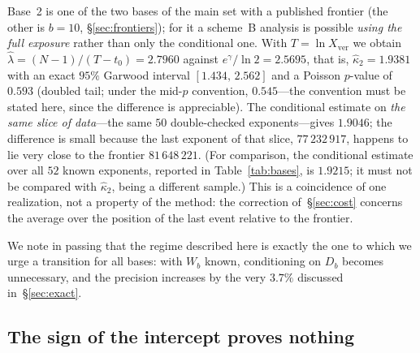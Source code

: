 \documentclass[11pt,a4paper]{article}
\theoremstyle{plain}
\theoremstyle{remark}
\newcommand{\eg}{e^{\gamma}}
\begin{document}
Base~2 is one of the two bases of the main set with a published frontier (the
other is $b=10$, \S\ref{sec:frontiers}); for it a scheme~B analysis is possible
\emph{using the full exposure} rather than only the conditional one. With
$T=\ln X_{\mathrm{ver}}$ we obtain
$\hat\lambda=(N-1)/(T-t_0)=2.7960$ against $\eg/\ln2=2.5695$, that is,
$\hat\kappa_2=1.9381$ with an exact $95\%$ Garwood interval $[1.434,\,2.562]$
and a Poisson $p$-value of $0.593$ (doubled tail; under the mid-$p$ convention,
$0.545$---the convention must be stated here, since the difference is
appreciable). The conditional estimate on \emph{the same slice of data}---the
same $50$ double-checked exponents---gives $1.9046$; the difference is small
because the last exponent of that slice, $77\,232\,917$, happens to lie very
close to the frontier $81\,648\,221$. (For comparison, the conditional estimate
over all $52$ known exponents, reported in Table~\ref{tab:bases}, is $1.9215$;
it must not be compared with $\hat\kappa_2$, being a different sample.) This is
a coincidence of one realization, not a property of the method: the correction
of~\S\ref{sec:cost} concerns the average over the position of the last event
relative to the frontier.

We note in passing that the regime described here is exactly the one to which
we urge a transition for all bases: with $W_b$ known, conditioning on $D_b$
becomes unnecessary, and the precision increases by the very $3.7\%$ discussed
in~\S\ref{sec:exact}.

\subsection{The sign of the intercept proves nothing}
\end{document}
